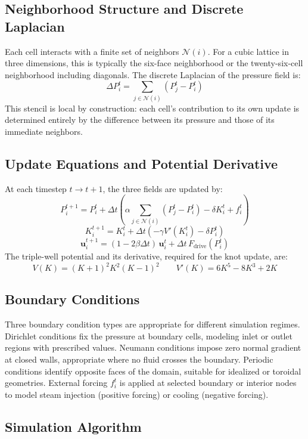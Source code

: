 \documentclass[12pt, a4paper]{article}
\begin{document}
\subsection{Neighborhood Structure and Discrete Laplacian}

Each cell interacts with a finite set of neighbors $\mathcal{N}(i)$. For a cubic lattice in three dimensions, this is typically the six-face neighborhood or the twenty-six-cell neighborhood including diagonals. The discrete Laplacian of the pressure field is:
\[
\Delta P_i^t = \sum_{j \in \mathcal{N}(i)} (P_j^t - P_i^t)
\]
This stencil is local by construction: each cell's contribution to its own update is determined entirely by the difference between its pressure and those of its immediate neighbors.

\subsection{Update Equations and Potential Derivative}

At each timestep $t \to t+1$, the three fields are updated by:
\[
P_i^{t+1} = P_i^t + \Delta t \left( \alpha \sum_{j \in \mathcal{N}(i)} (P_j^t - P_i^t) - \delta K_i^t + f_i^t \right)
\]
\[
K_i^{t+1} = K_i^t + \Delta t \left( -\gamma V'(K_i^t) - \delta P_i^t \right)
\]
\[
\mathbf{u}_i^{t+1} = (1 - 2\beta \Delta t)\, \mathbf{u}_i^t + \Delta t\, F_{\text{drive}}(P_i^t)
\]
The triple-well potential and its derivative, required for the knot update, are:
\[
V(K) = (K+1)^2 K^2 (K-1)^2
\qquad
V'(K) = 6K^5 - 8K^3 + 2K
\]

\subsection{Boundary Conditions}

Three boundary condition types are appropriate for different simulation regimes. Dirichlet conditions fix the pressure at boundary cells, modeling inlet or outlet regions with prescribed values. Neumann conditions impose zero normal gradient at closed walls, appropriate where no fluid crosses the boundary. Periodic conditions identify opposite faces of the domain, suitable for idealized or toroidal geometries. External forcing $f_i^t$ is applied at selected boundary or interior nodes to model steam injection (positive forcing) or cooling (negative forcing).

\subsection{Simulation Algorithm}
\end{document}
